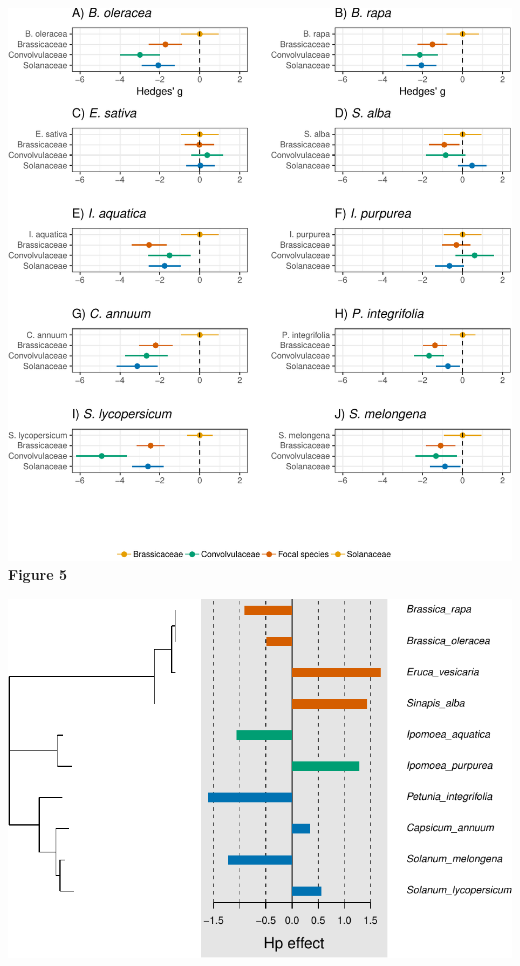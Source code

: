 \documentclass[]{article}
\begin{document}
\newpage

\includegraphics{output/figures/unnamed-chunk-7-1.pdf} \textbf{Figure 5}

\newpage

\begin{center}\includegraphics{output/figures/unnamed-chunk-8-1} \end{center}
\end{document}
